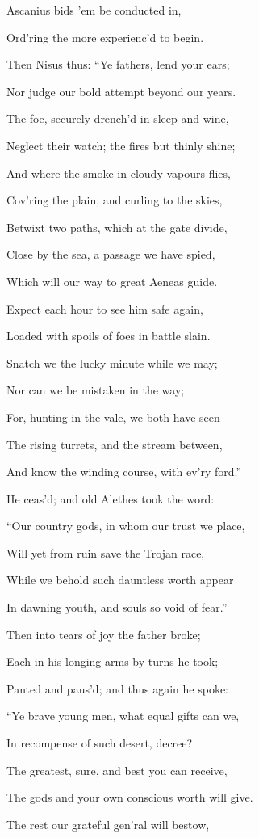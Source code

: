 Ascanius bids ’em be conducted in,

Ord’ring the more experienc’d to begin.

Then Nisus thus: “Ye fathers, lend your ears;

Nor judge our bold attempt beyond our years.

The foe, securely drench’d in sleep and wine,

Neglect their watch; the fires but thinly shine;

And where the smoke in cloudy vapours flies,

Cov’ring the plain, and curling to the skies,

Betwixt two paths, which at the gate divide,

Close by the sea, a passage we have spied,

Which will our way to great Aeneas guide.

Expect each hour to see him safe again,

Loaded with spoils of foes in battle slain.

Snatch we the lucky minute while we may;

Nor can we be mistaken in the way;

For, hunting in the vale, we both have seen

The rising turrets, and the stream between,

And know the winding course, with ev’ry ford.”

He ceas’d; and old Alethes took the word:

“Our country gods, in whom our trust we place,

Will yet from ruin save the Trojan race,

While we behold such dauntless worth appear

In dawning youth, and souls so void of fear.”

Then into tears of joy the father broke;

Each in his longing arms by turns he took;

Panted and paus’d; and thus again he spoke:

“Ye brave young men, what equal gifts can we,

In recompense of such desert, decree?

The greatest, sure, and best you can receive,

The gods and your own conscious worth will give.

The rest our grateful gen’ral will bestow,

